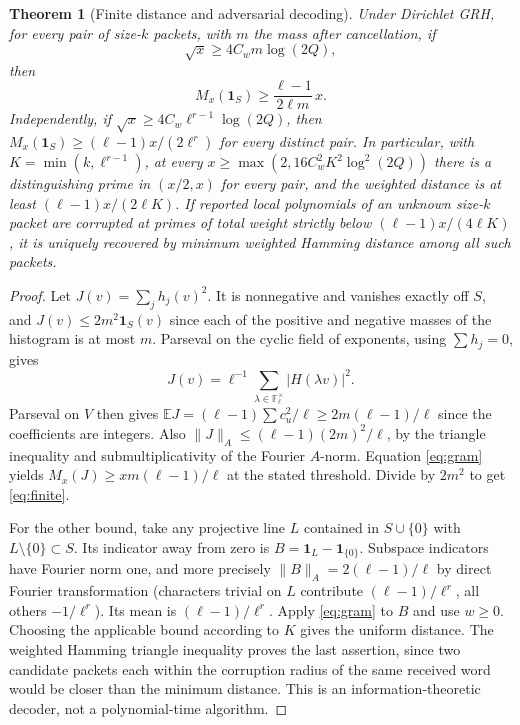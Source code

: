 \documentclass[11pt]{article}
\newtheorem{theorem}{Theorem}[section]
\theoremstyle{remark}\newtheorem{remark}[theorem]{Remark}
\newcommand{\F}{\mathbb F}
\newcommand{\E}{\mathbb E}
\newcommand{\one}{\mathbf 1}
\begin{document}
\begin{theorem}[Finite distance and adversarial decoding]\label{thm:finite}
Under Dirichlet GRH, for every pair of size-$k$ packets, with $m$ the mass after cancellation, if
\[
\sqrt{x}\ge 4C_w m\log(2Q),
\]
then
\begin{equation}\label{eq:finite}
M_x(\one_S)\ge\frac{\ell-1}{2\ell m}\,x.
\end{equation}
Independently, if $\sqrt{x}\ge4C_w\ell^{r-1}\log(2Q)$, then $M_x(\one_S)\ge (\ell-1)x/(2\ell^r)$ for every distinct pair. In particular, with $K=\min(k,\ell^{r-1})$, at every $x\ge\max(2,16C_w^2 K^2\log^2(2Q))$ there is a distinguishing prime in $(x/2,x)$ for every pair, and the weighted distance is at least $(\ell-1)x/(2\ell K)$. If reported local polynomials of an unknown size-$k$ packet are corrupted at primes of total weight strictly below $(\ell-1)x/(4\ell K)$, it is uniquely recovered by minimum weighted Hamming distance among all such packets.
\end{theorem}
\begin{proof}
Let $J(v)=\sum_j h_j(v)^2$. It is nonnegative and vanishes exactly off $S$, and $J(v)\le2m^2\one_S(v)$ since each of the positive and negative masses of the histogram is at most $m$. Parseval on the cyclic field of exponents, using $\sum h_j=0$, gives
\[
J(v)=\ell^{-1}\sum_{\lambda\in\F_\ell^\times}|H(\lambda v)|^2.
\]
Parseval on $V$ then gives $\E J=(\ell-1)\sum c_u^2/\ell\ge2m(\ell-1)/\ell$ since the coefficients are integers. Also $\|J\|_A\le(\ell-1)(2m)^2/\ell$, by the triangle inequality and submultiplicativity of the Fourier $A$-norm. Equation \eqref{eq:gram} yields $M_x(J)\ge x m(\ell-1)/\ell$ at the stated threshold. Divide by $2m^2$ to get \eqref{eq:finite}.

For the other bound, take any projective line $L$ contained in $S\cup\{0\}$ with $L\setminus\{0\}\subset S$. Its indicator away from zero is $B=\one_L-\one_{\{0\}}$. Subspace indicators have Fourier norm one, and more precisely $\|B\|_A=2(\ell-1)/\ell$ by direct Fourier transformation (characters trivial on $L$ contribute $(\ell-1)/\ell^r$, all others $-1/\ell^r$). Its mean is $(\ell-1)/\ell^r$. Apply \eqref{eq:gram} to $B$ and use $w\ge0$. Choosing the applicable bound according to $K$ gives the uniform distance. The weighted Hamming triangle inequality proves the last assertion, since two candidate packets each within the corruption radius of the same received word would be closer than the minimum distance. This is an information-theoretic decoder, not a polynomial-time algorithm.
\end{proof}
\end{document}
